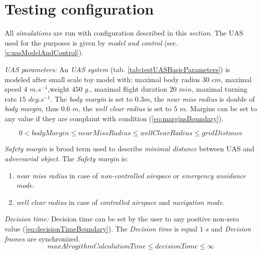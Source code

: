 \section{Testing configuration}\label{sec:testingConfiguration}

    \noindent All \emph{simulations} are run with configuration described in this \emph{section}. The UAS used for the purposes is given by \emph{model and control} (sec. \ref{s:uasModelAndControl}). 
    
    \emph{UAS parameters:} An \emph{UAS system} (tab. \ref{tab:testUASBasicParameters}) is modeled after small scale toy model with: maximal body radius $30$ $cm$, maximal speed $4$ $m.s^{-1}$,weight $450$ $g$., maximal flight duration $20$ $min$, maximal turning rate $15$ $deg.s^{-1}$. The \emph{body margin} is set to $0.3 m$, the \emph{near miss radius} is double of \emph{body margin}, thus $0.6$ $m$, the \emph{well clear radius} is set to $5$ $m$. Margins can be set to any value if they are complaint with condition (\ref{eq:marginsBoundary}).
    
    \begin{equation}\label{eq:marginsBoundary}
        0 < bodyMargin \le nearMissRadius \le wellClearRadius \le gridDistance
    \end{equation}   
    
    \begin{note}
        \emph{Safety margin} is broad term used to describe \emph{minimal distance} between UAS and \emph{adversarial object}. The \emph{Safety margin} is:
        \begin{enumerate}
            \item \emph{near miss radius} in case of \emph{non-controlled airspace} or \emph{emergency avoidance mode}.
            \item \emph{well clear radius} in case of \emph{controlled airspace} and \emph{navigation mode}.
        \end{enumerate}
    \end{note}
    
    \emph{Decision time:} Decision time can be set by the user to any positive non-zero value (\ref{eq:decisionTimeBoundary}). The \emph{Decision time} is equal $1$ $s$ and \emph{Decision frames} are synchronized.
    \begin{equation}\label{eq:decisionTimeBoundary}
        maxAlrogithmCalculationTime \le decisionTome \le \infty
    \end{equation}
    
